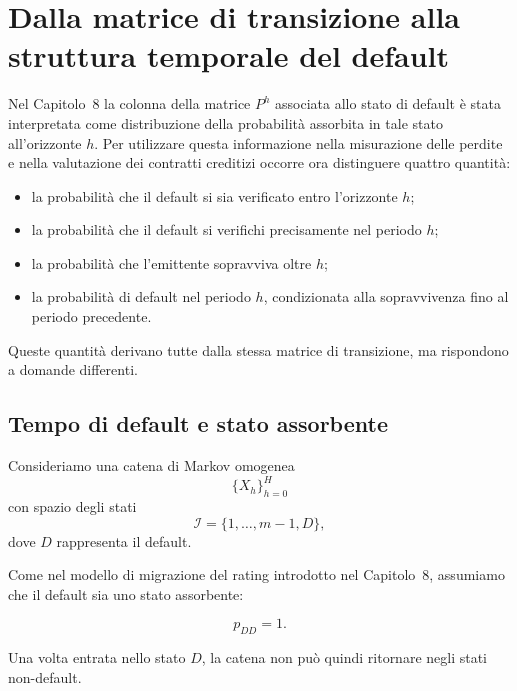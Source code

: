 \section{Dalla matrice di transizione alla struttura temporale del
default}

\label{sec:cap9-struttura-temporale-default}

Nel Capitolo~8 la colonna della matrice $P^{h}$ associata allo stato
di default \`{e} stata interpretata come distribuzione della
probabilit\`{a} assorbita in tale stato all'orizzonte $h$. Per
utilizzare questa informazione nella misurazione delle perdite e nella
valutazione dei contratti creditizi occorre ora distinguere quattro
quantit\`{a}:

\begin{itemize}

\item la probabilit\`{a} che il default si sia verificato entro
l'orizzonte $h$;

\item la probabilit\`{a} che il default si verifichi precisamente nel
periodo $h$;

\item la probabilit\`{a} che l'emittente sopravviva oltre $h$;

\item la probabilit\`{a} di default nel periodo $h$, condizionata alla
sopravvivenza fino al periodo precedente.

\end{itemize}

Queste quantit\`{a} derivano tutte dalla stessa matrice di transizione,
ma rispondono a domande differenti.

\subsection{Tempo di default e stato assorbente}

\label{subsec:cap9-tempo-default}

Consideriamo una catena di Markov omogenea
\[
\{X_h\}_{h=0}^{H}
\]
con spazio degli stati
\[
\mathcal{I}
=
\{1,\ldots,m-1,D\},
\]
dove $D$ rappresenta il default.

Come nel modello di migrazione del rating introdotto nel
Capitolo~8, assumiamo che il default sia uno stato assorbente:

\[
p_{DD}=1.
\]

Una volta entrata nello stato $D$, la catena non pu\`{o} quindi
ritornare negli stati non-default.

